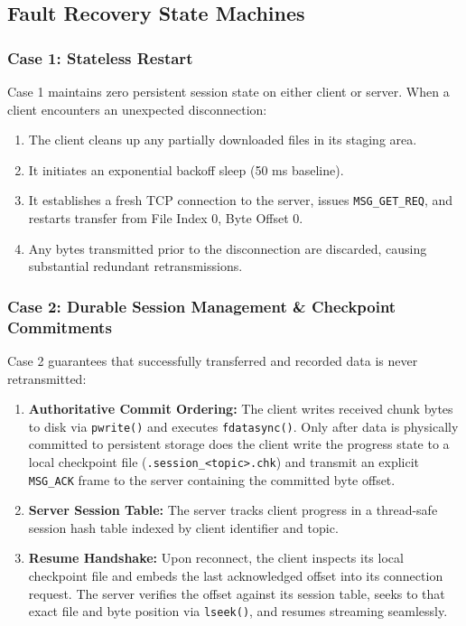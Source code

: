 \documentclass[11pt,a4paper]{article}
\begin{document}
\subsection{Fault Recovery State Machines}

\subsubsection{Case 1: Stateless Restart}
Case 1 maintains zero persistent session state on either client or server. When a client encounters an unexpected disconnection:
\begin{enumerate}
    \item The client cleans up any partially downloaded files in its staging area.
    \item It initiates an exponential backoff sleep (50 ms baseline).
    \item It establishes a fresh TCP connection to the server, issues \texttt{MSG\_GET\_REQ}, and restarts transfer from File Index 0, Byte Offset 0.
    \item Any bytes transmitted prior to the disconnection are discarded, causing substantial redundant retransmissions.
\end{enumerate}

\subsubsection{Case 2: Durable Session Management \& Checkpoint Commitments}
Case 2 guarantees that successfully transferred and recorded data is never retransmitted:
\begin{enumerate}
    \item \textbf{Authoritative Commit Ordering:} The client writes received chunk bytes to disk via \texttt{pwrite()} and executes \texttt{fdatasync()}. Only after data is physically committed to persistent storage does the client write the progress state to a local checkpoint file (\texttt{.session\_<topic>.chk}) and transmit an explicit \texttt{MSG\_ACK} frame to the server containing the committed byte offset.
    \item \textbf{Server Session Table:} The server tracks client progress in a thread-safe session hash table indexed by client identifier and topic.
    \item \textbf{Resume Handshake:} Upon reconnect, the client inspects its local checkpoint file and embeds the last acknowledged offset into its connection request. The server verifies the offset against its session table, seeks to that exact file and byte position via \texttt{lseek()}, and resumes streaming seamlessly.
\end{enumerate}
\end{document}
